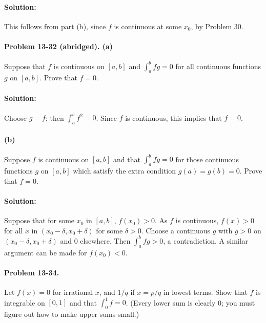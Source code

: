 \documentclass{article}
\begin{document}
\paragraph{Solution:} This follows from part (b), since $f$ is continuous at
some $x_0$, by Problem 30.

\paragraph{Problem 13-32 (abridged). (a)} Suppose that $f$ is continuous on
$[a, b]$ and $\int_a^b fg = 0$ for all continuous functions $g$ on $[a, b]$.
Prove that $f = 0$.

\paragraph{Solution:} Choose $g = f$; then $\int_a^b f^2 = 0$. Since $f$ is
continuous, this implies that $f = 0$.

\paragraph{(b)} Suppose $f$ is continuous on $[a, b]$ and that $\int_a^b fg =
0$ for those continuous functions $g$ on $[a, b]$ which satisfy the extra
condition $g(a) = g(b) = 0$. Prove that $f = 0$.

\paragraph{Solution:} Suppose that for some $x_0$ in $[a, b]$, $f(x_0) > 0$. As
$f$ is continuous, $f(x) > 0$ for all $x$ in $(x_0 - \delta, x_0 + \delta)$ for
some $\delta > 0$. Choose a continuous $g$ with $g > 0$ on $(x_0 - \delta, x_0
+ \delta)$ and 0 elsewhere. Then $\int_a^b fg > 0$, a contradiction. A similar
argument can be made for $f(x_0) < 0$.

\paragraph{Problem 13-34.} Let $f(x) = 0$ for irrational $x$, and $1/q$ if $x =
p/q$ in lowest terms. Show that $f$ is integrable on $[0, 1]$ and that
$\int_0^1 f = 0$. (Every lower sum is clearly 0; you must figure out how to
make upper sums small.)
\end{document}
